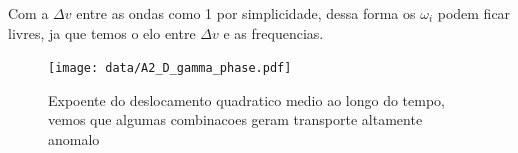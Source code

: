 \documentclass[12pt,a4paper]{article}
\begin{document}
Com a $\Delta v$ entre as ondas como 1 por simplicidade, dessa forma os $\omega_i$ podem ficar livres, ja que temos o elo entre $\Delta v$ e as frequencias.

\begin{figure}
\texttt{[image: data/A2\_D\_gamma\_phase.pdf]}
\caption{Expoente do deslocamento quadratico medio ao longo do tempo, vemos que algumas combinacoes geram transporte altamente anomalo}
\end{figure} 







\clearpage


\end{document}
